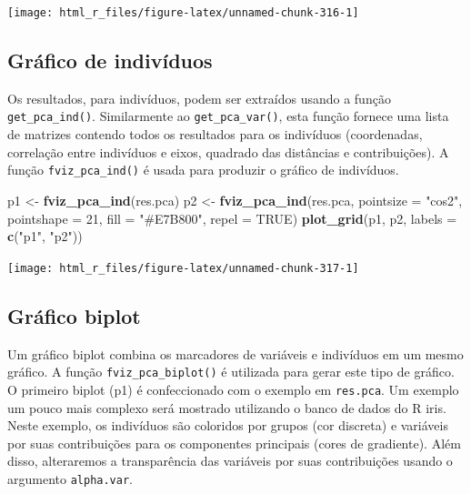 \documentclass[
]{book}
\newenvironment{Shaded}{\begin{snugshade}}{\end{snugshade}}
\newcommand{\DataTypeTok}[1]{\textcolor[rgb]{0.13,0.29,0.53}{#1}}
\newcommand{\DecValTok}[1]{\textcolor[rgb]{0.00,0.00,0.81}{#1}}
\newcommand{\KeywordTok}[1]{\textcolor[rgb]{0.13,0.29,0.53}{\textbf{#1}}}
\newcommand{\NormalTok}[1]{#1}
\newcommand{\OtherTok}[1]{\textcolor[rgb]{0.56,0.35,0.01}{#1}}
\newcommand{\StringTok}[1]{\textcolor[rgb]{0.31,0.60,0.02}{#1}}
\begin{document}
\begin{center}\texttt{[image: html\_r\_files/figure-latex/unnamed-chunk-316-1]} \end{center}

\hypertarget{gruxe1fico-de-indivuxedduos}{%
\subsection{Gráfico de indivíduos}\label{gruxe1fico-de-indivuxedduos}}

Os resultados, para indivíduos, podem ser extraídos usando a função \texttt{get\_pca\_ind()}. Similarmente ao \texttt{get\_pca\_var()}, esta função fornece uma lista de matrizes contendo todos os resultados para os indivíduos (coordenadas, correlação entre indivíduos e eixos, quadrado das distâncias e contribuições). A função \texttt{fviz\_pca\_ind()} é usada para produzir o gráfico de indivíduos.

\begin{Shaded}
\begin{Highlighting}[]
\NormalTok{p1 <-}\StringTok{ }\KeywordTok{fviz_pca_ind}\NormalTok{(res.pca)}
\NormalTok{p2 <-}\StringTok{ }\KeywordTok{fviz_pca_ind}\NormalTok{(res.pca,}
                   \DataTypeTok{pointsize =} \StringTok{"cos2"}\NormalTok{, }
                   \DataTypeTok{pointshape =} \DecValTok{21}\NormalTok{,}
                   \DataTypeTok{fill =} \StringTok{"#E7B800"}\NormalTok{,}
                   \DataTypeTok{repel =} \OtherTok{TRUE}\NormalTok{)}
\KeywordTok{plot_grid}\NormalTok{(p1, p2, }\DataTypeTok{labels =} \KeywordTok{c}\NormalTok{(}\StringTok{"p1"}\NormalTok{, }\StringTok{"p2"}\NormalTok{))}
\end{Highlighting}
\end{Shaded}

\begin{center}\texttt{[image: html\_r\_files/figure-latex/unnamed-chunk-317-1]} \end{center}

\hypertarget{gruxe1fico-biplot}{%
\subsection{Gráfico biplot}\label{gruxe1fico-biplot}}

Um gráfico biplot combina os marcadores de variáveis e indivíduos em um mesmo gráfico. A função \texttt{fviz\_pca\_biplot()} é utilizada para gerar este tipo de gráfico. O primeiro biplot (p1) é confeccionado com o exemplo em \texttt{res.pca}. Um exemplo um pouco mais complexo será mostrado utilizando o banco de dados do R iris. Neste exemplo, os indivíduos são coloridos por grupos (cor discreta) e variáveis por suas contribuições para os componentes principais (cores de gradiente). Além disso, alteraremos a transparência das variáveis por suas contribuições usando o argumento \texttt{alpha.var}. 
\end{document}
